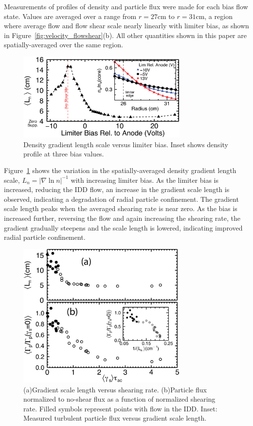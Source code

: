 \documentclass[aps,prl,amsmath,amssymb,preprint,superscriptaddress]{revtex4} %
\begin{document}
Measurements of profiles of density and particle flux
were made for each bias flow state. Values are averaged over a range
from $r=27$cm to $r=31$cm, a region where average flow and flow shear scale
nearly linearly with limiter bias, as shown in
Figure~\ref{fig:velocity_flowshear}(b).  All other quantities shown in this paper are spatially-averaged over the same region.

\begin{figure}[!htbp]
\centerline{
\includegraphics[width=8.5cm]{figure2.eps}}
\caption{\label{fig:densgrad} Density gradient length scale versus limiter bias. Inset shows density profile at three bias values.}
\end{figure}

Figure~\ref{fig:densgrad} shows the variation in the spatially-averaged density gradient length scale, $L_{n} = \lvert \nabla \ln n \rvert ^{-1}$ with
increasing limiter bias.  As the limiter bias is increased, reducing
the IDD flow, an increase in the gradient scale length is observed,
indicating a degradation of radial particle confinement. The gradient scale length peaks
when the averaged shearing rate is near zero. As the bias is
increased further, reversing the flow and again increasing the
shearing rate, the gradient gradually steepens and the
scale length is lowered, indicating improved radial particle confinement.  

\begin{figure}[!htbp]
\centerline{
\includegraphics[width=8.5cm]{figure3.eps}}
\caption{\label{fig:sheargradflux} (a)Gradient scale length versus shearing rate. (b)Particle flux normalized to no-shear
  flux as a function of normalized shearing rate. Filled symbols
  represent points with flow in the IDD. Inset: Measured turbulent particle flux versus
  gradient scale length.}
\end{figure}
\end{document}
